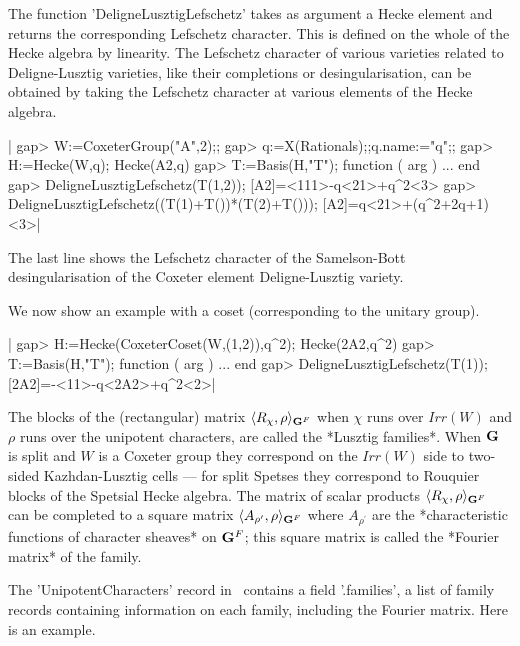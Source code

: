 The  function 'DeligneLusztigLefschetz'  takes as  argument a Hecke element
and  returns the corresponding Lefschetz character.  This is defined on the
whole of the Hecke algebra by linearity. The Lefschetz character of various
varieties  related to Deligne-Lusztig varieties,  like their completions or
desingularisation,  can be  obtained by  taking the  Lefschetz character at
various elements of the Hecke algebra.

|    gap> W:=CoxeterGroup("A",2);;
    gap> q:=X(Rationals);;q.name:="q";;
    gap> H:=Hecke(W,q);
    Hecke(A2,q)
    gap> T:=Basis(H,"T");
    function ( arg ) ... end
    gap> DeligneLusztigLefschetz(T(1,2));
    [A2]=<111>-q<21>+q^2<3>
    gap> DeligneLusztigLefschetz((T(1)+T())*(T(2)+T()));
    [A2]=q<21>+(q^2+2q+1)<3>|

The   last  line  shows  the   Lefschetz  character  of  the  Samelson-Bott
desingularisation of the Coxeter element Deligne-Lusztig variety.

We now show an example with a coset (corresponding to the unitary group).

|    gap> H:=Hecke(CoxeterCoset(W,(1,2)),q^2);
    Hecke(2A2,q^2)
    gap> T:=Basis(H,"T");
    function ( arg ) ... end
    gap> DeligneLusztigLefschetz(T(1));
    [2A2]=-<11>-q<2A2>+q^2<2>|


The blocks of the (rectangular) matrix $\langle R_\chi,\rho\rangle_{{\bf G}^F}$
when  $\chi$  runs  over  $Irr(W)$  and  $\rho$  runs  over  the  unipotent
characters,  are called the *Lusztig families*. When ${\bf G}$ is split and $W$
is  a  Coxeter  group  they  correspond  on  the $Irr(W)$ side to two-sided
Kazhdan-Lusztig  cells ---  for split  Spetses they  correspond to Rouquier
blocks  of  the  Spetsial  Hecke  algebra.  The  matrix  of scalar products
$\langle  R_\chi,\rho\rangle_{{\bf G}^F}$ can  be completed  to a square matrix
$\langle  A_{\rho^\prime},\rho\rangle_{{\bf G}^F}$ where  $A_{\rho^\prime}$ are
the *characteristic functions of character sheaves* on ${\bf G}^F$; this square
matrix is called the *Fourier matrix* of the family.

The  'UnipotentCharacters' record in \CHEVIE\ contains a field '.families',
a  list of family records containing  information on each family, including
the Fourier matrix. Here is an example.

